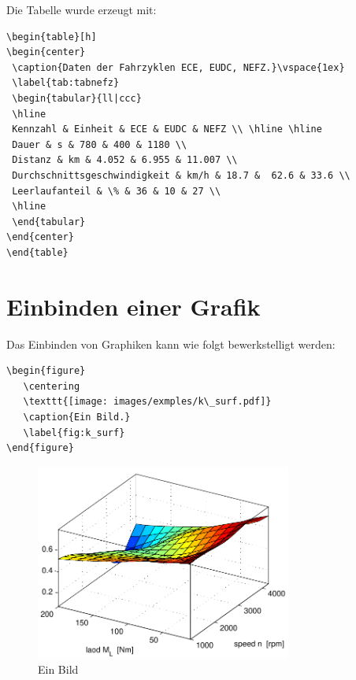 Die Tabelle wurde erzeugt mit:
\begin{verbatim}
\begin{table}[h]
\begin{center}
 \caption{Daten der Fahrzyklen ECE, EUDC, NEFZ.}\vspace{1ex}
 \label{tab:tabnefz}
 \begin{tabular}{ll|ccc}
 \hline
 Kennzahl & Einheit & ECE & EUDC & NEFZ \\ \hline \hline
 Dauer & s & 780 & 400 & 1180 \\
 Distanz & km & 4.052 & 6.955 & 11.007 \\
 Durchschnittsgeschwindigkeit & km/h & 18.7 &  62.6 & 33.6 \\
 Leerlaufanteil & \% & 36 & 10 & 27 \\
 \hline
 \end{tabular}
\end{center}
\end{table}
\end{verbatim}


\section{Einbinden einer Grafik}\label{sec:epsgraph}

Das Einbinden von Graphiken kann wie folgt bewerkstelligt werden:
\begin{verbatim}
\begin{figure}
   \centering
   \texttt{[image: images/exmples/k\_surf.pdf]}
   \caption{Ein Bild.}
   \label{fig:k_surf}
\end{figure}
\end{verbatim}

\begin{figure}
   \centering
   \includegraphics[width=0.75\textwidth]{images/examples/k_surf.pdf}
   \caption{Ein Bild}
   \label{pics:k_surf}
\end{figure}

